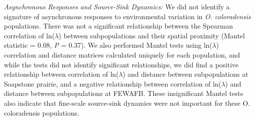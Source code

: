 \documentclass[12pt, letterpaper]{article}
\begin{document}
\textit{Asynchronous Responses and Source-Sink Dynamics:} We did not identify a signature of asynchronous responses to environmental variation in \textit{O. coloradensis} populations. There was not a significant relationship between the Spearman correlation of ln($\lambda$) between subpopulations and their spatial proximity (Mantel statistic = 0.08, \textit{P} = 0.37). We also performed Mantel tests using ln($\lambda$) correlation and distance matrices calculated uniquely for each population, and while the tests did not identify significant relationships, we did find a positive relationship between correlation of ln($\lambda$) and distance between subpopulations at Soapstone prairie, and a negative relationship between correlation of ln($\lambda$) and distance between subpopulations at FEWAFB. These insignificant Mantel tests also indicate that fine-scale source-sink dynamics were not important for these O. coloradensis populations. 


\end{document}
